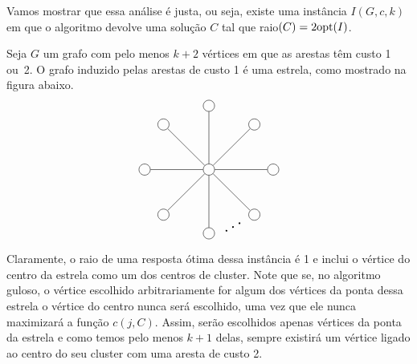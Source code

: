 Vamos mostrar que essa análise é justa, ou seja, existe uma instância $I(G,c,k)$ em que o algoritmo devolve uma solução $C$ tal que raio$(C) = 2 \mathrm{opt}(I)$. 

Seja $G$ um grafo com pelo menos $k+2$ vértices em que as arestas têm custo 1 ou~2. O grafo induzido pelas arestas de custo 1 é uma estrela, como mostrado na figura abaixo.
\[
\begin{tikzpicture}
    \def\n{8}
    
    \def\r{2cm}
    
    \def\rotationangle{90}
    
    \draw (0,0) node[circle, draw, minimum size=10pt, inner sep=1.5pt] (center) {};
    
    \begin{scope}[rotate=\rotationangle]
      \foreach \i in {1,...,\n} {
        \draw (\i*360/\n:\r) node[circle, draw, minimum size=10pt, inner sep=1.5pt] (\i) {};
      }
    \end{scope}
    
    \foreach \i in {1,...,\n} {
      \draw (center) -- (\i);
    }
    \draw (4) node[shift={(0.75,0.2)}] {\rotatebox{30}{\scalebox{1.5}{$\ldots$}}} (4);
  \end{tikzpicture}
  \]

  Claramente, o raio de uma resposta ótima dessa instância é 1 e inclui o vértice do centro da estrela como um dos centros de cluster.
  Note que se, no algoritmo guloso, o vértice escolhido arbitrariamente for algum dos vértices da ponta dessa estrela o vértice do centro nunca será escolhido, uma vez que ele nunca maximizará a função $c(j,C)$. Assim, serão escolhidos apenas vértices da ponta da estrela e como temos pelo menos $k+1$ delas, sempre existirá um vértice ligado ao centro do seu cluster com uma aresta de custo 2.